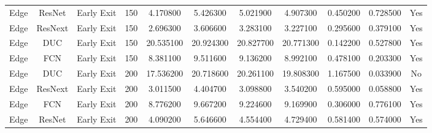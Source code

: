 \begin{tabular}{|c||c||c||c||c||c||c||c||c||c||c|}
Edge & ResNet & Early Exit & 150 & 4.170800 & 5.426300 & 5.021900 & 4.907300 & 0.450200 & 0.728500 & Yes \\
Edge & ResNext & Early Exit & 150 & 2.696300 & 3.606600 & 3.283100 & 3.227100 & 0.295600 & 0.379100 & Yes \\
Edge & DUC & Early Exit & 150 & 20.535100 & 20.924300 & 20.827700 & 20.771300 & 0.142200 & 0.527800 & Yes \\
Edge & FCN & Early Exit & 150 & 8.381100 & 9.511600 & 9.136200 & 8.992100 & 0.478100 & 0.203300 & Yes \\
Edge & DUC & Early Exit & 200 & 17.536200 & 20.718600 & 20.261100 & 19.808300 & 1.167500 & 0.033900 & No \\
Edge & ResNext & Early Exit & 200 & 3.011500 & 4.404700 & 3.098800 & 3.540200 & 0.595000 & 0.058800 & Yes \\
Edge & FCN & Early Exit & 200 & 8.776200 & 9.667200 & 9.224600 & 9.169900 & 0.306000 & 0.776100 & Yes \\
Edge & ResNet & Early Exit & 200 & 4.090200 & 5.646600 & 4.554400 & 4.729400 & 0.581400 & 0.574000 & Yes \\
\bottomrule
\end{tabular}
